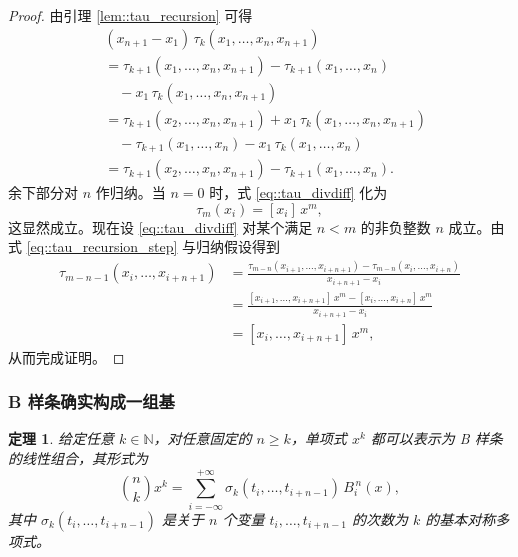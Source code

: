 \documentclass[a4paper]{ctexart}
\newtheorem{theorem}{定理}
\numberwithin{theorem}{section}
\numberwithin{equation}{section}
\numberwithin{figure}{section}
\numberwithin{remark}{section}
\begin{document}
\begin{proof}
由引理 \ref{lem::tau_recursion} 可得
\begin{equation}
\label{eq::tau_recursion_step}
\begin{array}{rl}
& (x_{n+1}-x_1)\,\tau_k(x_1,\ldots,x_n,x_{n+1}) \\
&=\tau_{k+1}(x_1,\ldots,x_n,x_{n+1})-\tau_{k+1}(x_1,\ldots,x_n)\\
&\quad -x_1\,\tau_k(x_1,\ldots,x_n,x_{n+1})\\
&=\tau_{k+1}(x_2,\ldots,x_n,x_{n+1})+x_1\,\tau_k(x_1,\ldots,x_n,x_{n+1})\\
&\quad -\tau_{k+1}(x_1,\ldots,x_n)-x_1\,\tau_k(x_1,\ldots,x_n)\\
&=\tau_{k+1}(x_2,\ldots,x_n,x_{n+1})-\tau_{k+1}(x_1,\ldots,x_n).
\end{array}
\end{equation}
余下部分对 $n$ 作归纳。当 $n=0$ 时，式 \eqref{eq::tau_divdiff} 化为
\[
\tau_m(x_i)=[x_i]\,x^{m},
\]
这显然成立。现在设 \eqref{eq::tau_divdiff} 对某个满足 $n<m$ 的非负整数 $n$ 成立。由式 \eqref{eq::tau_recursion_step} 与归纳假设得到
\[
\begin{aligned}
\tau_{m-n-1}(x_i,\ldots,x_{i+n+1})
&=\frac{\tau_{m-n}(x_{i+1},\ldots,x_{i+n+1})-\tau_{m-n}(x_i,\ldots,x_{i+n})}{x_{i+n+1}-x_i}\\
&=\frac{[x_{i+1},\ldots,x_{i+n+1}]\,x^{m}-[x_i,\ldots,x_{i+n}]\,x^{m}}{x_{i+n+1}-x_i}\\
&=[x_i,\ldots,x_{i+n+1}]\,x^{m},
\end{aligned}
\]
从而完成证明。
\end{proof}

\subsubsection{B 样条确实构成一组基}
\label{subsubsec::bspline_basis}

\begin{theorem}
    \label{thm::bspline_basis}
给定任意 $k\in\mathbb{N}$，对任意固定的 $n\ge k$，单项式 $x^{k}$ 都可以表示为 B 样条的线性组合，其形式为
\begin{equation}
\label{eq::monomial_bspline_combo}
\binom{n}{k}x^{k}=\sum_{i=-\infty}^{+\infty}\sigma_k(t_i,\ldots,t_{i+n-1})\,B^{\,n}_i(x),
\end{equation}
其中 $\sigma_k(t_i,\ldots,t_{i+n-1})$ 是关于 $n$ 个变量 $t_i,\ldots,t_{i+n-1}$ 的次数为 $k$ 的基本对称多项式。
\end{theorem}
\end{document}
